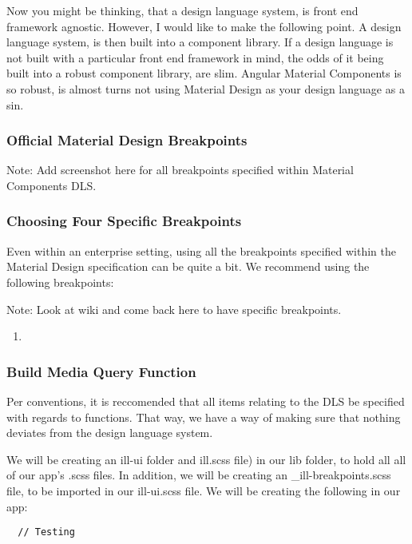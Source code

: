 Now you might be thinking, that a design language system, is front end framework
agnostic. However, I would like to make the following point. A design language
system, is then built into a component library. If a design language is not
built with a particular front end framework in mind, the odds of it being
built into a robust component library, are slim. Angular Material Components is
so robust, is almost turns not using Material Design as your design language as
a sin.

\subsubsection{ Official Material Design Breakpoints }
Note: Add screenshot here for all breakpoints specified within Material
Components DLS.

\subsubsection{ Choosing Four Specific Breakpoints }
Even within an enterprise setting, using all the breakpoints specified within
the Material Design specification can be quite a bit. We recommend using the
following breakpoints:

Note: Look at wiki and come back here to have specific breakpoints.
\begin{enumerate}
  \item
\end{enumerate}

\subsubsection{ Build Media Query Function }
Per conventions, it is reccomended that all items relating to the DLS be
specified with regards to functions. That way, we have a way of making sure
that nothing deviates from the design language system.

We will be creating an ill-ui folder and ill.scss file) in our lib folder, to
hold all all of our app's .scss files. In addition, we will be creating an
 \_ill-breakpoints.scss file, to be imported in our ill-ui.scss file. We will be
creating the following in our app:

\begin{verbatim}
  // Testing
\end{verbatim}

